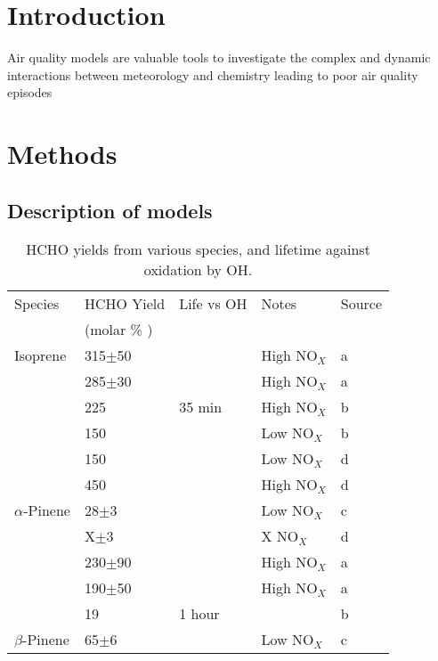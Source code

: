 \section{Introduction}
\label{sec:intro}
Air quality models are valuable tools to investigate the complex and dynamic interactions between meteorology and chemistry leading to poor air quality episodes

\section{Methods}
\label{sec:methods}
  \subsection{Description of models}
  
 \begin{table} \begin{threeparttable}
    \caption{ HCHO yields from various species, and lifetime against oxidation by OH. }
    \begin{tabular}{  l  l  l  l  l  }
      \toprule
      Species           & HCHO Yield      & Life vs OH & Notes    & Source
      \\                & (molar \% )     &        &              &          \\
      \midrule
      Isoprene          & 315$\pm$50      &        & High NO$_X$  & a        \\
      & 285$\pm$30      &        & High NO$_X$  & a        \\
      & 225             & 35 min & High NO$_X$  & b        \\ %
      & 150             &        & Low  NO$_X$  & b        \\ %
      & 150             &        & Low  NO$_X$  & d        \\
      & 450             &        & High  NO$_X$ & d        \\
      $\alpha$-Pinene   & 28$\pm$3        &        & Low NO$_X$   & c        \\
      & X$\pm$3         &        & X NO$_X$     & d        \\
      & 230$\pm$90      &        & High NO$_X$  & a        \\
      & 190$\pm$50      &        & High NO$_X$  & a        \\
      & 19              & 1 hour &              & b        \\ %
      $\beta$-Pinene    & 65$\pm$6        &        & Low NO$_X$   & c      \\

\end{tabular}
\end{threeparttable}
\end{table}
